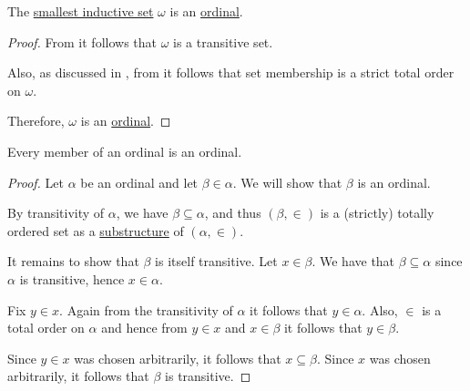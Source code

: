 \begin{proposition}\label{thm:omega_is_an_ordinal}
  The \hyperref[thm:smallest_inductive_set_existence]{smallest inductive set} \( \omega \) is an \hyperref[def:ordinal]{ordinal}.
\end{proposition}
\begin{proof}
  From  it follows that \( \omega \) is a transitive set.

  Also, as discussed in , from  it follows that set membership is a strict total order on \( \omega \).

  Therefore, \( \omega \) is an \hyperref[def:ordinal]{ordinal}.
\end{proof}

\begin{proposition}\label{thm:member_of_ordinal_is_ordinal}
  Every member of an ordinal is an ordinal.
\end{proposition}
\begin{proof}
  Let \( \alpha \) be an ordinal and let \( \beta \in \alpha \). We will show that \( \beta \) is an ordinal.

  By transitivity of \( \alpha \), we have \( \beta \subseteq \alpha \), and thus \( (\beta, \in) \) is a (strictly) totally ordered set as a \hyperref[def:first_order_substructure]{substructure} of \( (\alpha, \in) \).

  It remains to show that \( \beta \) is itself transitive. Let \( x \in \beta \). We have that \( \beta \subseteq \alpha \) since \( \alpha \) is transitive, hence \( x \in \alpha \).

  Fix \( y \in x \). Again from the transitivity of \( \alpha \) it follows that \( y \in \alpha \). Also, \( \in \) is a total order on \( \alpha \) and hence from \( y \in x \) and \( x \in \beta \) it follows that \( y \in \beta \).

  Since \( y \in x \) was chosen arbitrarily, it follows that \( x \subseteq \beta \). Since \( x \) was chosen arbitrarily, it follows that \( \beta \) is transitive.
\end{proof}

